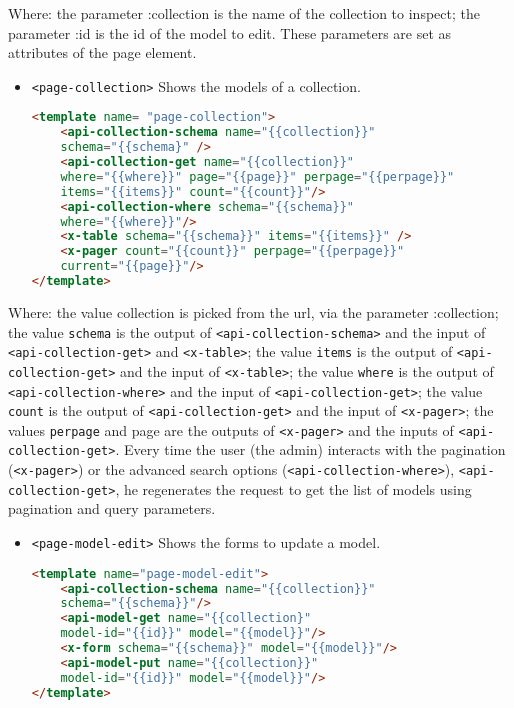 Where: the parameter :collection is the name of the collection to inspect; the parameter :id is the id of the model to edit. These parameters are set as attributes of the page element.

\begin{itemize} \item \texttt{<page-collection>} Shows the models of a collection.
\begin{lstlisting}[language=html]
<template name= "page-collection">
	<api-collection-schema name="{{collection}}" 
	schema="{{schema}" />
	<api-collection-get name="{{collection}}" 
	where="{{where}}" page="{{page}}" perpage="{{perpage}}"
	items="{{items}}" count="{{count}}"/>
	<api-collection-where schema="{{schema}}" 
	where="{{where}}"/>
	<x-table schema="{{schema}}" items="{{items}}" />
	<x-pager count="{{count}}" perpage="{{perpage}}" 
	current="{{page}}"/>
</template>
\end{lstlisting}
\end{itemize}

Where: the value collection is picked from the url, via the parameter :collection; the value \texttt{schema} is the output of \texttt{<api-collection-schema>} and the input of \texttt{<api-collection-get>} and \texttt{<x-table>}; the value \texttt{items} is the output of \texttt{<api-collection-get>} and the input of \texttt{<x-table>}; the value \texttt{where} is the output of \texttt{<api-collection-where>} and the input of \texttt{<api-collection-get>}; the value \texttt{count} is the output of \texttt{<api-collection-get>} and the input of \texttt{<x-pager>}; the values \texttt{perpage} and page are the outputs of \texttt{<x-pager>} and the inputs of \texttt{<api-collection-get>}.
Every time the user (the admin) interacts with the pagination (\texttt{<x-pager>}) or the advanced search options (\texttt{<api-collection-where>}), \texttt{<api-collection-get>}, he regenerates the request to get the list of models using pagination and query parameters.


\begin{itemize} \item \texttt{<page-model-edit>} Shows the forms to update a model.
\begin{lstlisting}[language=html]
<template name="page-model-edit">
	<api-collection-schema name="{{collection}}"
	schema="{{schema}}"/>
	<api-model-get name="{{collection}"
	model-id="{{id}}" model="{{model}}"/>
	<x-form schema="{{schema}}" model="{{model}}"/>
	<api-model-put name="{{collection}}"
	model-id="{{id}}" model="{{model}}"/>
</template>
\end{lstlisting}
\end{itemize}

